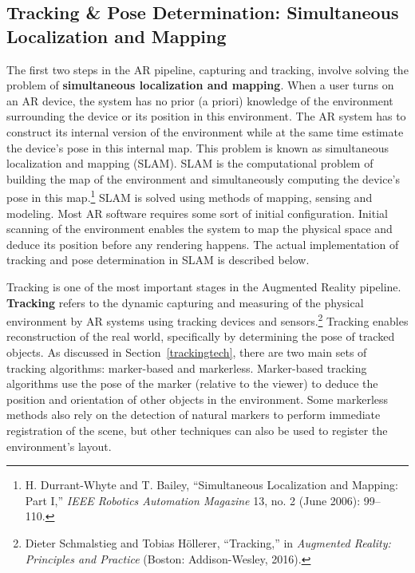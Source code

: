 \subsection{Tracking \& Pose Determination: Simultaneous Localization and Mapping}
The first two steps in the AR pipeline, capturing and tracking, involve solving the problem of \textbf{simultaneous localization and mapping}. When a user turns on an AR device, the system has no prior (a priori) knowledge of the environment surrounding the device or its position in this environment. The AR system has to construct its internal version of the environment while at the same time estimate the device's pose in this internal map. This problem is known as simultaneous localization and mapping (SLAM). SLAM is the computational problem of building the map of the environment and simultaneously computing the device’s pose in this map.\footnote{H. Durrant-Whyte and T. Bailey, “Simultaneous Localization and Mapping: Part I,” \textit{IEEE Robotics Automation Magazine} 13, no. 2 (June 2006): 99–110.} SLAM is solved using methods of mapping, sensing and modeling. Most AR software requires some sort of initial configuration. Initial scanning of the environment enables the system to map the physical space and deduce its position before any rendering happens. The actual implementation of tracking and pose determination in SLAM is described below.

Tracking is one of the most important stages in the Augmented Reality pipeline. \textbf{Tracking} refers to the dynamic capturing and measuring of the physical environment by AR systems using tracking devices and sensors.\footnote{Dieter Schmalstieg and Tobias Höllerer, “Tracking,” in \textit{Augmented Reality: Principles and Practice} (Boston: Addison-Wesley, 2016).} Tracking enables reconstruction of the real world, specifically by determining the pose of tracked objects. As discussed in Section~\ref{trackingtech}, there are two main sets of tracking algorithms: marker-based and markerless. Marker-based tracking algorithms use the pose of the marker (relative to the viewer) to deduce the position and orientation of other objects in the environment. Some markerless methods also rely on the detection of natural markers to perform immediate registration of the scene, but other techniques can also be used to register the environment's layout.

